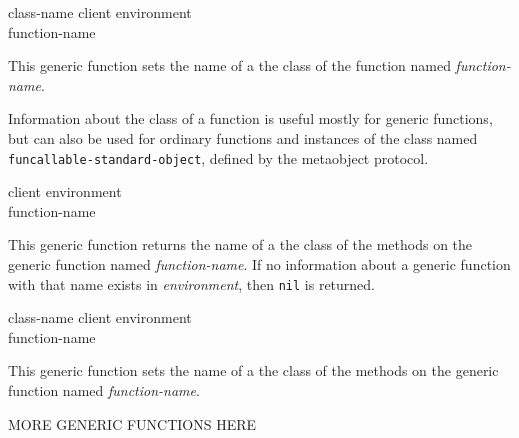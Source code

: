  {class-name client environment \\
function-name}

This generic function sets the name of a the class of the function
named \textit{function-name}.

Information about the class of a function is useful mostly for generic
functions, but can also be used for ordinary functions and instances
of the class named \texttt{funcallable-standard-object}, defined by
the metaobject protocol.

 {client environment \\ function-name}

This generic function returns the name of a the class of the methods
on the generic function named \textit{function-name}.  If no information
about a generic function with that name exists in
\textit{environment}, then \texttt{nil} is returned.

 {class-name client environment \\
function-name}

This generic function sets the name of a the class of the methods on
the generic function named \textit{function-name}.

MORE GENERIC FUNCTIONS HERE

